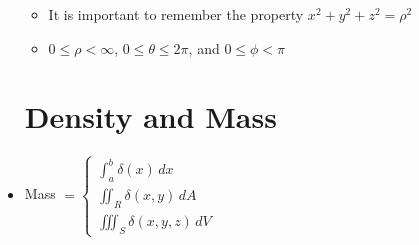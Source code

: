 \begin{itemize}
\begin{itemize}
        \item It is important to remember the property $x^2 + y^2 + z^2 = \rho^2$

          \item $0\leq \rho < \infty$, $0\leq\theta\leq2\pi$, and $0 \leq \phi < \pi$

      \end{itemize}

      \section{Density and Mass}

    \item Mass $=\left\{\begin{array}{l} \displaystyle \int_a^b \delta(x)\,dx \\ \displaystyle \iint_R \delta(x,y)\,dA\\ \displaystyle \iiint_S \delta(x,y,z)\,dV \end{array}$

\end{itemize}



